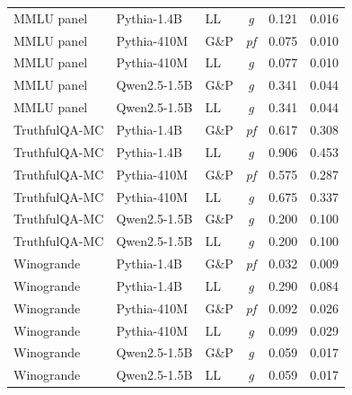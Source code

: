 \documentclass[11pt]{article}
\begin{document}
\begin{table}[h]
\begin{tabular}{lllcrr}
MMLU panel    & Pythia-1.4B  & LL   & \textit{g}  & 0.121 & 0.016 \\
MMLU panel    & Pythia-410M  & G\&P & \textit{pf} & 0.075 & 0.010 \\
MMLU panel    & Pythia-410M  & LL   & \textit{g}  & 0.077 & 0.010 \\
MMLU panel    & Qwen2.5-1.5B & G\&P & \textit{g}  & 0.341 & 0.044 \\
MMLU panel    & Qwen2.5-1.5B & LL   & \textit{g}  & 0.341 & 0.044 \\
TruthfulQA-MC & Pythia-1.4B  & G\&P & \textit{pf} & 0.617 & 0.308 \\
TruthfulQA-MC & Pythia-1.4B  & LL   & \textit{g}  & 0.906 & 0.453 \\
TruthfulQA-MC & Pythia-410M  & G\&P & \textit{pf} & 0.575 & 0.287 \\
TruthfulQA-MC & Pythia-410M  & LL   & \textit{g}  & 0.675 & 0.337 \\
TruthfulQA-MC & Qwen2.5-1.5B & G\&P & \textit{g}  & 0.200 & 0.100 \\
TruthfulQA-MC & Qwen2.5-1.5B & LL   & \textit{g}  & 0.200 & 0.100 \\
Winogrande    & Pythia-1.4B  & G\&P & \textit{pf} & 0.032 & 0.009 \\
Winogrande    & Pythia-1.4B  & LL   & \textit{g}  & 0.290 & 0.084 \\
Winogrande    & Pythia-410M  & G\&P & \textit{pf} & 0.092 & 0.026 \\
Winogrande    & Pythia-410M  & LL   & \textit{g}  & 0.099 & 0.029 \\
Winogrande    & Qwen2.5-1.5B & G\&P & \textit{g}  & 0.059 & 0.017 \\
Winogrande    & Qwen2.5-1.5B & LL   & \textit{g}  & 0.059 & 0.017 \\
\bottomrule
\end{tabular}
\end{table}
\end{document}
